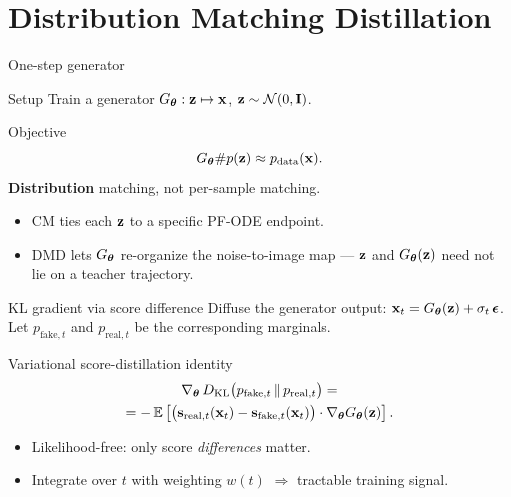\documentclass{beamer}
\begin{document}
\section{Distribution Matching Distillation}
\begin{frame}{One-step generator}
	\begin{block}{Setup}
		Train a generator $G_{\boldsymbol{\theta}}: \mathbf{z} \mapsto \mathbf{x}$, $\mathbf{z} \sim \mathcal{N}(0, \mathbf{I})$.
	\end{block}
	\eqpause
	\begin{block}{Objective}
		\vspace{-0.3cm}
		\[
			G_{\boldsymbol{\theta}} \# p(\mathbf{z}) \approx p_{\text{data}}(\mathbf{x}).
		\]
		\textbf{Distribution} matching, not per-sample matching.
	\end{block}
	\eqpause
	\begin{itemize}
		\item CM ties each $\mathbf{z}$ to a specific PF-ODE endpoint.
		\item DMD lets $G_{\boldsymbol{\theta}}$ re-organize the noise-to-image map --- $\mathbf{z}$ and $G_{\boldsymbol{\theta}}(\mathbf{z})$ need not lie on a teacher trajectory.
	\end{itemize}
\end{frame}
\begin{frame}{KL gradient via score difference}
	Diffuse the generator output: $\mathbf{x}_t = G_{\boldsymbol{\theta}}(\mathbf{z}) + \sigma_t\, \boldsymbol{\epsilon}$. Let $p_{\text{fake}, t}$ and $p_{\text{real}, t}$ be the corresponding marginals.
	\eqpause
	\begin{block}{Variational score-distillation identity}
		\vspace{-0.6cm}
		\begin{multline*}
			\nabla_{\boldsymbol{\theta}}\, D_\mathrm{KL}\bigl(p_{\text{fake}, t} \,\|\, p_{\text{real}, t}\bigr) = \\
			= -\, \mathbb{E} \left[\bigl(\mathbf{s}_{\text{real}, t}(\mathbf{x}_t) - \mathbf{s}_{\text{fake}, t}(\mathbf{x}_t)\bigr) \cdot \nabla_{\boldsymbol{\theta}} G_{\boldsymbol{\theta}}(\mathbf{z}) \right].
		\end{multline*}
		\vspace{-0.5cm}
	\end{block}
	\eqpause
	\begin{itemize}
		\item Likelihood-free: only score \emph{differences} matter.
		\item Integrate over $t$ with weighting $w(t)$ $\Rightarrow$ tractable training signal.
	\end{itemize}
\end{frame}
\end{document}
